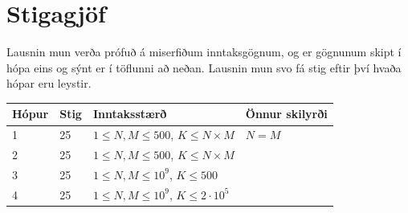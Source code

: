 \section*{Stigagjöf}
Lausnin mun verða prófuð á miserfiðum inntaksgögnum, og er gögnunum skipt í
hópa eins og sýnt er í töflunni að neðan. Lausnin mun svo fá stig eftir því
hvaða hópar eru leystir.

\begin{tabular}{|l|l|l|l|}
\hline
Hópur & Stig & Inntaksstærð & Önnur skilyrði \\ \hline
1     & 25   & $1 \le N, M \leq 500$, $K \leq N\times M$ & $N = M$ \\ \hline
2     & 25   & $1 \le N, M \leq 500$, $K \leq N\times M$ &  \\ \hline
3     & 25   & $1 \le N, M \leq 10^9$, $K \leq 500$ & \\ \hline
4     & 25   & $1 \le N, M \leq 10^9$, $K \leq 2\cdot 10^5$ & \\ \hline
\end{tabular}


